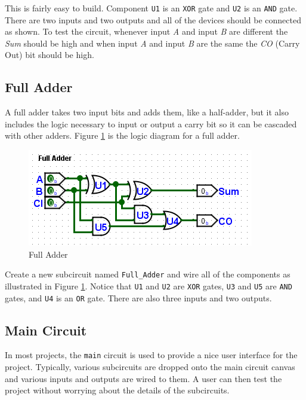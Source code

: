 This is fairly easy to build. Component \texttt{U1} is an \texttt{XOR} gate and \texttt{U2} is an \texttt{AND} gate. There are two inputs and two outputs and all of the devices should be connected as shown. To test the circuit, whenever input \textit{A} and input \textit{B} are different the \textit{Sum} should be high and when input \textit{A} and input \textit{B} are the same the \textit{CO} (Carry Out) bit should be high.

\subsection{Full Adder}

A full adder takes two input bits and adds them, like a half-adder, but it also includes the logic necessary to input or output a carry bit so it can be cascaded with other adders. Figure \ref{fig:add-02} is the logic diagram for a full adder.

\begin{figure}[H]
	\centering
	\includegraphics[width=\maxwidth{.95\linewidth}]{gfx/add-02}
	\caption{Full Adder}
	\label{fig:add-02}
\end{figure}

Create a new subcircuit named \lstinline[columns=fixed]|Full_Adder| and wire all of the components as illustrated in Figure \ref{fig:add-02}. Notice that \texttt{U1} and \texttt{U2} are \texttt{XOR} gates, \texttt{U3} and \texttt{U5} are \texttt{AND} gates, and \texttt{U4} is an \texttt{OR} gate. There are also three inputs and two outputs.

\subsection{Main Circuit}

In most \LE projects, the \lstinline[columns=fixed]|main| circuit is used to provide a nice user interface for the project. Typically, various subcircuits are dropped onto the main circuit canvas and various inputs and outputs are wired to them. A user can then test the project without worrying about the details of the subcircuits.

